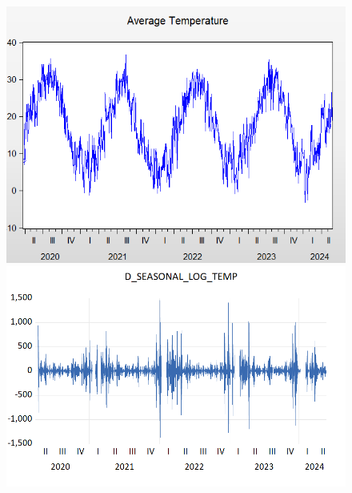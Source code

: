 \documentclass{article} %
\begin{document}
\begin{figure}[H]
    \centering
    \begin{minipage}{0.5\linewidth}
        \includegraphics[width=\linewidth]{images/image33.png}
    \end{minipage}%
    \begin{minipage}{0.5\linewidth}
        \includegraphics[width=\linewidth]{images/image36d.png}
    \end{minipage}
\end{figure}
\end{document}
